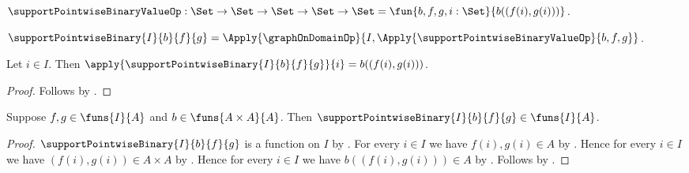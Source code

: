 \begin{definition}\label{support_pointwise_binary_value_op}
    $\supportPointwiseBinaryValueOp:
        \Set\to\Set\to\Set\to\Set\to\Set
        =\fun{b,f,g,i:\Set}{b((f(i),g(i)))}$.
\end{definition}

\begin{definition}\label{support_pointwise_binary}
    $\supportPointwiseBinary{I}{b}{f}{g}
        =\Apply{\graphOnDomainOp}{
            I,\Apply{\supportPointwiseBinaryValueOp}{b,f,g}}$.
\end{definition}

\begin{proposition}\label{support_pointwise_binary_apply}
    Let $i\in I$.
    Then
        $\apply{\supportPointwiseBinary{I}{b}{f}{g}}{i}
        =b((f(i),g(i)))$.
\end{proposition}
\begin{proof}
    Follows by
        .
\end{proof}

\begin{proposition}\label{support_pointwise_binary_type}
    Suppose $f,g\in\funs{I}{A}$ and $b\in\funs{A\times A}{A}$.
    Then $\supportPointwiseBinary{I}{b}{f}{g}\in\funs{I}{A}$.
\end{proposition}
\begin{proof}
    $\supportPointwiseBinary{I}{b}{f}{g}$ is a function on $I$ by
        .
    For every $i\in I$ we have $f(i),g(i)\in A$ by
        .
    Hence for every $i\in I$ we have $(f(i),g(i))\in A\times A$ by
        .
    Hence for every $i\in I$ we have $b((f(i),g(i)))\in A$ by
        .
    Follows by
        .
\end{proof}

